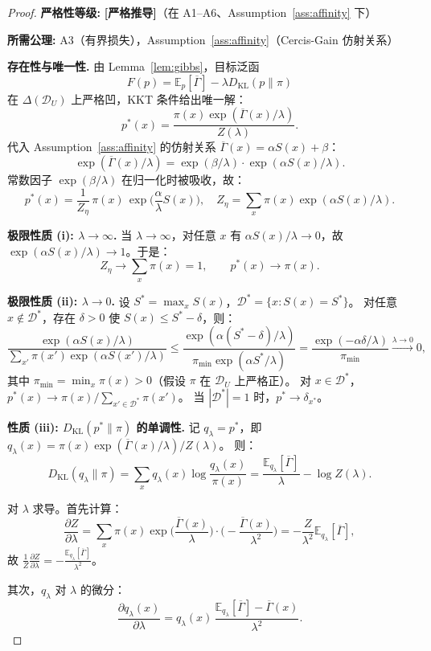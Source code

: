 \documentclass[12pt,a4paper]{article}
\newcommand{\E}{\mathbb{E}}
\newcommand{\cD}{\mathcal{D}}
\newcommand{\KL}{D_{\mathrm{KL}}}
\newcommand{\rigorous}{\textbf{[严格推导]}}
\begin{document}
\begin{proof}
\textbf{严格性等级:} \rigorous \quad（在 A1--A6、Assumption~\ref{ass:affinity} 下）

\textbf{所需公理:} A3（有界损失），Assumption~\ref{ass:affinity}（Cercis-Gain 仿射关系）

\textbf{存在性与唯一性.}
由 Lemma~\ref{lem:gibbs}，目标泛函
\[
F(p)=\E_p[\overline{\Gamma}] - \lambda\KL(p\|\pi)
\]
在 $\Delta(\cD_U)$ 上严格凹，KKT 条件给出唯一解：
\[
p^*(x) = \frac{\pi(x)\exp(\overline{\Gamma}(x)/\lambda)}{Z(\lambda)}.
\]
代入 Assumption~\ref{ass:affinity} 的仿射关系 $\overline{\Gamma}(x)=\alpha S(x)+\beta$：
\[
\exp(\overline{\Gamma}(x)/\lambda) = \exp(\beta/\lambda)\cdot\exp(\alpha S(x)/\lambda).
\]
常数因子 $\exp(\beta/\lambda)$ 在归一化时被吸收，故：
\[
p^*(x) = \frac{1}{Z_\eta}\,\pi(x)\,\exp\!\Big(\frac{\alpha}{\lambda}S(x)\Big),\quad
Z_\eta = \sum_x \pi(x)\exp(\alpha S(x)/\lambda).
\]

\textbf{极限性质 (i): $\lambda\to\infty$.}
当 $\lambda\to\infty$，对任意 $x$ 有 $\alpha S(x)/\lambda\to 0$，故 $\exp(\alpha S(x)/\lambda)\to 1$。于是：
\[
Z_\eta \to \sum_x \pi(x) = 1,\qquad p^*(x) \to \pi(x).
\]

\textbf{极限性质 (ii): $\lambda\to 0$.}
设 $S^* = \max_x S(x)$，$\cD^* = \{x: S(x)=S^*\}$。
对任意 $x\notin\cD^*$，存在 $\delta>0$ 使 $S(x)\le S^*-\delta$，则：
\[
\frac{\exp(\alpha S(x)/\lambda)}{\sum_{x'}\pi(x')\exp(\alpha S(x')/\lambda)}
\le \frac{\exp(\alpha(S^*-\delta)/\lambda)}{\pi_{\min}\exp(\alpha S^*/\lambda)}
= \frac{\exp(-\alpha\delta/\lambda)}{\pi_{\min}} \xrightarrow{\lambda\to0} 0,
\]
其中 $\pi_{\min}=\min_x\pi(x)>0$（假设 $\pi$ 在 $\cD_U$ 上严格正）。
对 $x\in\cD^*$，$p^*(x)\to \pi(x)/\sum_{x'\in\cD^*}\pi(x')$。
当 $|\cD^*|=1$ 时，$p^*\to\delta_{x^*}$。

\textbf{性质 (iii): $\KL(p^*\|\pi)$ 的单调性.}
记 $q_\lambda = p^*$，即 $q_\lambda(x) = \pi(x)\exp(\overline{\Gamma}(x)/\lambda)/Z(\lambda)$。
则：
\[
\KL(q_\lambda\|\pi) = \sum_x q_\lambda(x)\log\frac{q_\lambda(x)}{\pi(x)}
= \frac{\E_{q_\lambda}[\overline{\Gamma}]}{\lambda} - \log Z(\lambda).
\]

对 $\lambda$ 求导。首先计算：
\[
\frac{\partial Z}{\partial\lambda}
= \sum_x \pi(x)\exp\!\Big(\frac{\overline{\Gamma}(x)}{\lambda}\Big)\cdot\Big(-\frac{\overline{\Gamma}(x)}{\lambda^2}\Big)
= -\frac{Z}{\lambda^2}\E_{q_\lambda}[\overline{\Gamma}],
\]
故 $\displaystyle\frac{1}{Z}\frac{\partial Z}{\partial\lambda} = -\frac{\E_{q_\lambda}[\overline{\Gamma}]}{\lambda^2}$。

其次，$q_\lambda$ 对 $\lambda$ 的微分：
\[
\frac{\partial q_\lambda(x)}{\partial\lambda}
= q_\lambda(x)\,\frac{\E_{q_\lambda}[\overline{\Gamma}]-\overline{\Gamma}(x)}{\lambda^2}.
\]


\end{proof}
\end{document}
